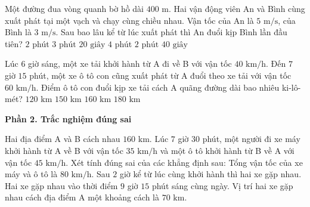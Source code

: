\begin{ex} %
Một đường đua vòng quanh bờ hồ dài $400\text{ m}$. Hai vận động viên An và Bình cùng xuất phát tại một vạch và chạy cùng chiều nhau. Vận tốc của An là $5\text{ m/s}$, của Bình là $3\text{ m/s}$. Sau bao lâu kể từ lúc xuất phát thì An đuổi kịp Bình lần đầu tiên?
\choice
{$2$ phút}
{\True $3\text{ phút } 20\text{ giây}$}
{$4$ phút}
{$2\text{ phút } 40\text{ giây}$}
\end{ex}

\begin{ex} %
Lúc $6$ giờ sáng, một xe tải khởi hành từ A đi về B với vận tốc $40\text{ km/h}$. Đến $7$ giờ $15$ phút, một xe ô tô con cũng xuất phát từ A đuổi theo xe tải với vận tốc $60\text{ km/h}$. Điểm ô tô con đuổi kịp xe tải cách A quãng đường dài bao nhiêu ki-lô-mét?
\choice
{$120\text{ km}$}
{\True $150\text{ km}$}
{$160\text{ km}$}
{$180\text{ km}$}
\end{ex}

\textbf{Phần 2. Trắc nghiệm đúng sai}

\begin{ex} %
Hai địa điểm A và B cách nhau $160\text{ km}$. Lúc $7$ giờ $30$ phút, một người đi xe máy khởi hành từ A về B với vận tốc $35\text{ km/h}$ và một ô tô khởi hành từ B về A với vận tốc $45\text{ km/h}$. Xét tính đúng sai của các khẳng định sau:
\choiceTF
{\True Tổng vận tốc của xe máy và ô tô là $80\text{ km/h}$.}
{\True Sau $2$ giờ kể từ lúc cùng khởi hành thì hai xe gặp nhau.}
{Hai xe gặp nhau vào thời điểm $9$ giờ $15$ phút sáng cùng ngày.}
{\True Vị trí hai xe gặp nhau cách địa điểm A một khoảng cách là $70\text{ km}$.}
\end{ex}


